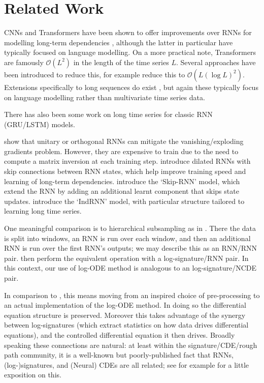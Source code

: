 \documentclass{article}
\begin{document}
\section{Related Work}
CNNs and Transformers have been shown to offer improvements over RNNs for modelling long-term dependencies \citep{bai2018empirical, li2019enhancing}, although the latter in particular have typically focused on language modelling. On a more practical note, Transformers are famously $\mathcal{O}(L^2)$ in the length of the time series $L$. Several approaches have been introduced to reduce this, for example \citet{li2019enhancing} reduce this to $\mathcal{O}(L(\log L)^2)$. Extensions specifically to long sequences do exist \citep{sourkov2018igloo}, but again these typically focus on language modelling rather than multivariate time series data. 

There has also been some work on long time series for classic RNN (GRU/LSTM) models.

\citet{wisdom2016full, jing2019gated} show that unitary or orthogonal RNNs can mitigate the vanishing/exploding gradients problem. However, they are expensive to train due to the need to compute a matrix inversion at each training step. \citet{chang2017dilated} introduce dilated RNNs with skip connections between RNN states, which help improve training speed and learning of long-term dependencies. \citet{campos2017skip} introduce the `Skip-RNN' model, which extend the RNN by adding an additional learnt component that skips state updates. \citet{li2018independently} introduce the `IndRNN' model, with particular structure tailored to learning long time series.

One meaningful comparison is to hierarchical subsampling as in \citet{graves2012supervised, de2015survey}. There the data is split into windows, an RNN is run over each window, and then an additional RNN is run over the first RNN's outputs; we may describe this as an RNN/RNN pair. \citet{liao2019learning} then perform the equivalent operation with a log-signature/RNN pair. In this context, our use of log-ODE method is analogous to an log-signature/NCDE pair.

In comparison to \citet{liao2019learning}, this means moving from an inspired choice of pre-processing to an actual implementation of the log-ODE method. In doing so the differential equation structure is preserved. Moreover this takes advantage of the synergy between log-signatures (which extract statistics on how data drives differential equations), and the controlled differential equation it then drives. Broadly speaking these connections are natural: at least within the signature/CDE/rough path community, it is a well-known but poorly-published fact that RNNs, (log-)signatures, and (Neural) CDEs are all related; see for example \citet{kidger2020neural} for a little exposition on this.
\end{document}
